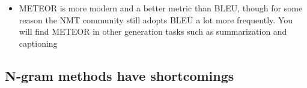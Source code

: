 \documentclass[11pt]{article}
\begin{document}
\begin{minipage}[l]{.5\linewidth}
    \centering
\end{minipage}\hfill
\begin{minipage}[r]{.5\linewidth}
    \begin{itemize}
        \item METEOR is more modern and a better metric than BLEU, though for some reason the NMT community still adopts BLEU a lot more frequently. You will find METEOR in other generation tasks such as summarization and captioning
    \end{itemize}
\end{minipage}

\subsection{N-gram methods have shortcomings}
\end{document}
